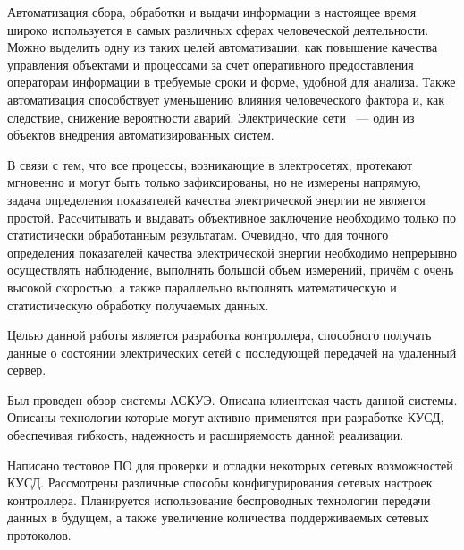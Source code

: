 \documentclass[utf8x,12pt, coursreport]{G7-32}
\begin{document}
\Introduction
Автоматизация сбора, обработки и выдачи информации в настоящее время широко используется в самых различных сферах человеческой деятельности. Можно выделить одну из таких целей автоматизации, как повышение качества управления объектами и процессами за счет оперативного предоставления операторам информации в требуемые сроки и форме, удобной для анализа. Также автоматизация способствует уменьшению влияния человеческого фактора и, как следствие, снижение вероятности аварий. Электрические сети ~--- один из объектов внедрения автоматизированных систем.

В связи с тем, что все процессы, возникающие в электросетях, протекают мгновенно и могут быть только зафиксированы, но не измерены напрямую, задача определения показателей качества электрической энергии не является простой. Расcчитывать и выдавать объективное заключение необходимо только по статистически обработанным результатам. Очевидно, что для точного определения показателей качества электрической энергии необходимо непрерывно осуществлять наблюдение, выполнять большой объем измерений, причём с очень высокой скоростью, а также параллельно выполнять математическую и статистическую обработку получаемых данных.\cite{qualitymonitor}

Целью данной работы является разработка контроллера, способного получать данные о состоянии электрических сетей с последующей передачей на удаленный сервер.


\mainmatter %











\backmatter %


\Conclusion

Был проведен обзор системы АСКУЭ. Описана клиентская часть данной системы. Описаны технологии которые могут активно применятся при разработке КУСД, обеспечивая гибкость, надежность и расширяемость данной реализации.

Написано тестовое ПО для проверки и отладки некоторых сетевых возможностей КУСД. Рассмотрены различные способы конфигурирования сетевых настроек контроллера. Планируется использование беспроводных технологии передачи данных в будущем, а также увеличение количества поддерживаемых сетевых протоколов.
\end{document}
